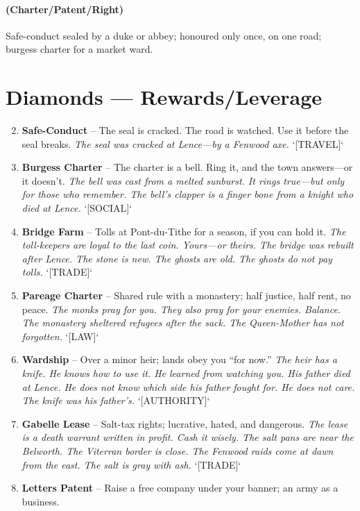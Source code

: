 \paragraph*{(Charter/Patent/Right)} Safe-conduct sealed by a duke or abbey; honoured only once, on one road; burgess charter for a market ward.

\section*{Diamonds --- Rewards/Leverage}
\label{sec:vhasia-rewards}
\begin{enumerate}
\setcounter{enumi}{1}
\item \textbf{Safe-Conduct} -- The seal is cracked. The road is watched. Use it before the seal breaks.
  \hfill \textit{The seal was cracked at Lence---by a Fenwood axe.} `[TRAVEL]`
\item \textbf{Burgess Charter} -- The charter is a bell. Ring it, and the town answers---or it doesn't.
  \hfill \textit{The bell was cast from a melted sunburst. It rings true---but only for those who remember. The bell's clapper is a finger bone from a knight who died at Lence.} `[SOCIAL]`
\item \textbf{Bridge Farm} -- Tolls at Pont-du-Tithe for a season, if you can hold it.
  \hfill \textit{The toll-keepers are loyal to the last coin. Yours---or theirs. The bridge was rebuilt after Lence. The stone is new. The ghosts are old. The ghosts do not pay tolls.} `[TRADE]`
\item \textbf{Pareage Charter} -- Shared rule with a monastery; half justice, half rent, no peace.
  \hfill \textit{The monks pray for you. They also pray for your enemies. Balance. The monastery sheltered refugees after the sack. The Queen-Mother has not forgotten.} `[LAW]`
\item \textbf{Wardship} -- Over a minor heir; lands obey you ``for now.''
  \hfill \textit{The heir has a knife. He knows how to use it. He learned from watching you. His father died at Lence. He does not know which side his father fought for. He does not care. The knife was his father's.} `[AUTHORITY]`
\item \textbf{Gabelle Lease} -- Salt-tax rights; lucrative, hated, and dangerous.
  \hfill \textit{The lease is a death warrant written in profit. Cash it wisely. The salt pans are near the Belworth. The Viterran border is close. The Fenwood raids come at dawn from the east. The salt is gray with ash.} `[TRADE]`
\item \textbf{Letters Patent} -- Raise a free company under your banner; an army as a business.

\end{enumerate}
